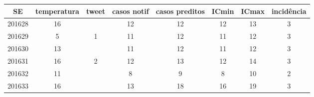 \begin{tabular}{c|ccccccc}
  \hline
SE & temperatura & tweet & casos notif & casos preditos & ICmin & ICmax & incidência \\ 
  \hline
201628 & 16 &  & 12 & 12 & 12 & 13 & 3 \\ 
  201629 & 5 & 1 & 11 & 12 & 11 & 12 & 3 \\ 
  201630 & 13 &  & 11 & 12 & 11 & 12 & 3 \\ 
  201631 & 16 & 2 & 12 & 13 & 12 & 14 & 3 \\ 
  201632 & 11 &  & 8 & 9 & 8 & 10 & 2 \\ 
  201633 & 16 &  & 13 & 18 & 16 & 19 & 3 \\ 
   \hline
\end{tabular}
